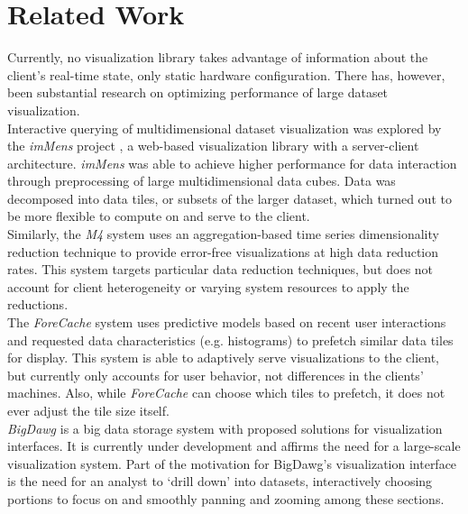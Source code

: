 \section{Related Work}\label{visgoth-ch:related-work}

Currently, no visualization library takes advantage of information about the
client's real-time state, only static hardware configuration. There has,
however, been substantial research on optimizing performance of large dataset
visualization. \\

Interactive querying of multidimensional dataset visualization was explored by
the \emph{imMens} project \cite{immens}, a web-based visualization library with
a server-client architecture. \emph{imMens} was able to achieve higher
performance for data interaction through preprocessing of large
multidimensional data cubes. Data was decomposed into data tiles, or subsets of
the larger dataset, which turned out to be more flexible to compute on and
serve to the client. \\

Similarly, the \emph{M4} system \cite{m4} uses an aggregation-based time series
dimensionality reduction technique to provide error-free visualizations at high
data reduction rates. This system targets particular data reduction techniques,
but does not account for client heterogeneity or varying system resources to
apply the reductions. \\

The \emph{ForeCache} system \cite{forecache} uses predictive models based on
recent user interactions and requested data characteristics (e.g. histograms)
to prefetch similar data tiles for display. This system is able to adaptively
serve visualizations to the client, but currently only accounts for user
behavior, not differences in the clients' machines. Also, while
\emph{ForeCache} can choose which tiles to prefetch, it does not ever adjust
the tile size itself.\\

\emph{BigDawg} \cite{bigdawg} is a big data storage system with proposed solutions
for visualization interfaces. It is currently under development and affirms the
need for a large-scale visualization system. Part of the motivation for
BigDawg's visualization interface is the need for an analyst to `drill down'
into datasets, interactively choosing portions to focus on and smoothly panning
and zooming among these sections. \\

